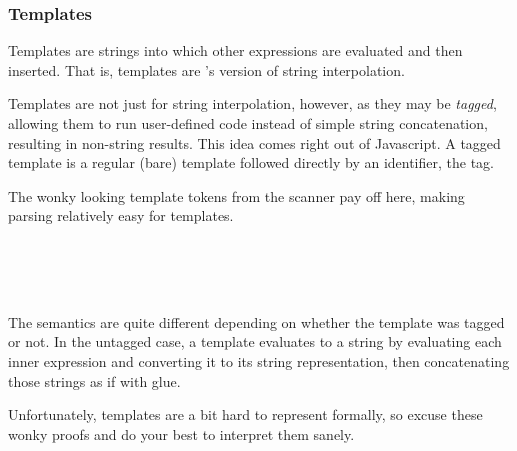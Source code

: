 \subsubsection{Templates}

Templates are strings into which other expressions are evaluated and then inserted.
That is, templates are \Trilogy{}'s version of string interpolation.

Templates are not just for string interpolation, however, as they may be \emph{tagged},
allowing them to run user-defined code instead of simple string concatenation,
resulting in non-string results. This idea comes right out of Javascript. A tagged
template is a regular (bare) template followed directly by an identifier, the tag.

The wonky looking template tokens from the scanner pay off here, making parsing
relatively easy for templates.

\begin{bnf*}
     \\
     \\
     \\
\end{bnf*}

The semantics are quite different depending on whether the template was tagged
or not. In the untagged case, a template evaluates to a string by evaluating each
inner expression and converting it to its string representation, then concatenating
those strings as if with glue.

Unfortunately, templates are a bit hard to represent formally, so excuse these wonky
proofs and do your best to interpret them sanely.

\begin{prooftree}
\end{prooftree}

